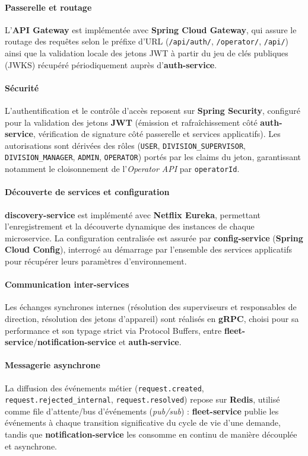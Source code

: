 \documentclass[11pt,a4paper]{article}
\begin{document}
\paragraph{Passerelle et routage}
L'\textbf{API Gateway} est implémentée avec \textbf{Spring Cloud Gateway}, qui assure le
routage des requêtes selon le préfixe d'URL (\texttt{/api/auth/}, \texttt{/operator/},
\texttt{/api/}) ainsi que la validation locale des jetons JWT à partir du jeu de clés
publiques (JWKS) récupéré périodiquement auprès d'\textbf{auth-service}.

\paragraph{Sécurité}
L'authentification et le contrôle d'accès reposent sur \textbf{Spring Security}, configuré
pour la validation des jetons \textbf{JWT} (émission et rafraîchissement côté
\textbf{auth-service}, vérification de signature côté passerelle et services applicatifs).
Les autorisations sont dérivées des rôles (\texttt{USER}, \texttt{DIVISION\_SUPERVISOR},
\texttt{DIVISION\_MANAGER}, \texttt{ADMIN}, \texttt{OPERATOR}) portés par les claims du
jeton, garantissant notamment le cloisonnement de l'\textit{Operator API} par
\texttt{operatorId}.

\paragraph{Découverte de services et configuration}
\textbf{discovery-service} est implémenté avec \textbf{Netflix Eureka}, permettant
l'enregistrement et la découverte dynamique des instances de chaque microservice. La
configuration centralisée est assurée par \textbf{config-service} (\textbf{Spring Cloud
Config}), interrogé au démarrage par l'ensemble des services applicatifs pour récupérer
leurs paramètres d'environnement.

\paragraph{Communication inter-services}
Les échanges synchrones internes (résolution des superviseurs et responsables de direction,
résolution des jetons d'appareil) sont réalisés en \textbf{gRPC}, choisi pour sa performance
et son typage strict via Protocol Buffers, entre \textbf{fleet-service}/\textbf{notification-service}
et \textbf{auth-service}.

\paragraph{Messagerie asynchrone}
La diffusion des événements métier (\texttt{request.created}, \texttt{request.rejected\_internal},
\texttt{request.resolved}) repose sur \textbf{Redis}, utilisé comme file d'attente/bus
d'événements (\textit{pub/sub}) : \textbf{fleet-service} publie les événements à chaque
transition significative du cycle de vie d'une demande, tandis que \textbf{notification-service}
les consomme en continu de manière découplée et asynchrone.
\end{document}
